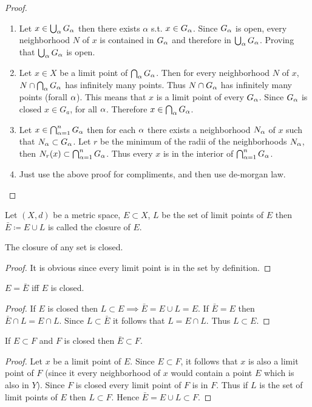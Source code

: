 \begin{proof}
  \begin{enumerate}
    \item Let $x\in \bigcup_\alpha G_\alpha$ then there exists $\alpha$ s.t. $x\in G_\alpha$. Since $G_\alpha$ is open, every neighborhood $N$ of $x$ is contained in $G_\alpha$ and therefore in $\bigcup_\alpha G_\alpha$. Proving that $\bigcup_\alpha G_\alpha$ is open.
    \item Let $x\in X$ be a limit point of $\bigcap_\alpha G_\alpha$. Then for every neighborhood $N$ of $x$, $N\cap \bigcap_\alpha G_\alpha$ has infinitely many points. Thus $N\cap G_\alpha$ has infinitely many points (forall $\alpha$). This means that $x$ is a limit point of every $G_\alpha$. Since $G_\alpha$ is closed $x\in G_a$, for all $\alpha$. Therefore $x\in \bigcap_\alpha G_\alpha$.
    \item Let $x\in \bigcap_{\alpha=1}^n G_\alpha$ then for each $\alpha$ there exists a neighborhood $N_\alpha$ of $x$ such that $N_\alpha\subset G_\alpha$. Let $r$ be the minimum of the radii of the neighborhoods $N_\alpha$, then $N_r(x) \subset \bigcap_{\alpha=1}^n G_\alpha$. Thus every $x$ is in the interior of $\bigcap_{\alpha =1}^n G_\alpha$.
    \item Just use the above proof for compliments, and then use de-morgan law.
  \end{enumerate}
\end{proof}
\begin{definition}
  Let $(X,d)$ be a metric space, $E\subset X$, $L$ be the set of limit points of $E$ then $\bar{E} \coloneq E\cup L$ is called the closure of $E$.
\end{definition}
\begin{proposition}
  The closure of any set is closed.
\end{proposition}
\begin{proof}
  It is obvious since every limit point is in the set by definition.
\end{proof}
\begin{proposition}
  $E=\bar{E}$ iff $E$ is closed.
\end{proposition}
\begin{proof}
  If $E$ is closed then $L\subset E \implies \bar{E} = E\cup L = E$. If $\bar{E} = E$ then $\bar{E}\cap L = E\cap L$. Since $L\subset \bar{E}$ it follows that $L = E\cap L$. Thus $L\subset E$.
\end{proof}
\begin{proposition}
  If $E\subset F$ and $F$ is closed then $\bar{E} \subset F$.
\end{proposition}
\begin{proof}
  Let $x$ be a limit point of $E$. Since $E\subset F$, it follows that $x$ is also a limit point of $F$ (since it every neighborhood of $x$ would contain a point $E$ which is also in $Y$). Since $F$ is closed every limit point of $F$ is in $F$. Thus if $L$ is the set of limit points of $E$ then $L\subset F$. Hence $\bar{E} = E\cup L \subset F$.
\end{proof}
